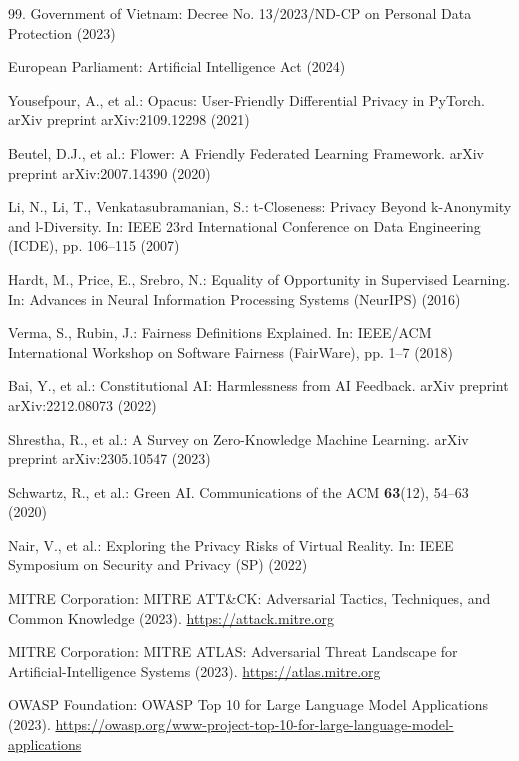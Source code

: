 \begin{thebibliography}{99.}
 Government of Vietnam: Decree No. 13/2023/ND-CP on Personal Data Protection (2023)

 European Parliament: Artificial Intelligence Act (2024)

 Yousefpour, A., et al.: Opacus: User-Friendly Differential Privacy in PyTorch. arXiv preprint arXiv:2109.12298 (2021)

 Beutel, D.J., et al.: Flower: A Friendly Federated Learning Framework. arXiv preprint arXiv:2007.14390 (2020)

 Li, N., Li, T., Venkatasubramanian, S.: t-Closeness: Privacy Beyond k-Anonymity and l-Diversity. In: IEEE 23rd International Conference on Data Engineering (ICDE), pp. 106--115 (2007)

 Hardt, M., Price, E., Srebro, N.: Equality of Opportunity in Supervised Learning. In: Advances in Neural Information Processing Systems (NeurIPS) (2016)

 Verma, S., Rubin, J.: Fairness Definitions Explained. In: IEEE/ACM International Workshop on Software Fairness (FairWare), pp. 1--7 (2018)

 Bai, Y., et al.: Constitutional AI: Harmlessness from AI Feedback. arXiv preprint arXiv:2212.08073 (2022)

 Shrestha, R., et al.: A Survey on Zero-Knowledge Machine Learning. arXiv preprint arXiv:2305.10547 (2023)

 Schwartz, R., et al.: Green AI. Communications of the ACM \textbf{63}(12), 54--63 (2020)

 Nair, V., et al.: Exploring the Privacy Risks of Virtual Reality. In: IEEE Symposium on Security and Privacy (SP) (2022)

 MITRE Corporation: MITRE ATT\&CK: Adversarial Tactics, Techniques, and Common Knowledge (2023). \url{https://attack.mitre.org}

 MITRE Corporation: MITRE ATLAS: Adversarial Threat Landscape for Artificial-Intelligence Systems (2023). \url{https://atlas.mitre.org}

 OWASP Foundation: OWASP Top 10 for Large Language Model Applications (2023). \url{https://owasp.org/www-project-top-10-for-large-language-model-applications}

\end{thebibliography}
